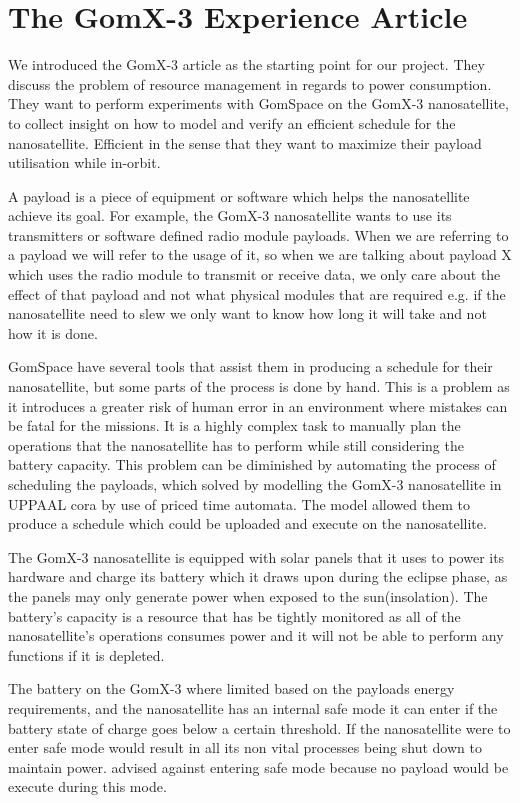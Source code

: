 \section{The GomX-3 Experience Article}
We introduced the GomX-3 article as the starting point for our project. They discuss the problem of resource management in regards to power consumption. They want to perform experiments with GomSpace on the GomX-3 nanosatellite, to collect insight on how to model and verify an efficient schedule for the nanosatellite. Efficient in the sense that they want to maximize their payload utilisation while in-orbit. 

A payload is a piece of equipment or software which helps the nanosatellite achieve its goal. For example, the GomX-3 nanosatellite wants to use its transmitters or software defined radio module payloads. When we are referring to a payload we will refer to the usage of it, so when we are talking about payload X which uses the radio module to transmit or receive data, we only care about the effect of that payload and not what physical modules that are required e.g. if the nanosatellite need to slew we only want to know how long it will take and not how it is done.

GomSpace have several tools that assist them in producing a schedule for their nanosatellite, but some parts of the process is done by hand. This is a problem as it introduces a greater risk of human error in an environment where mistakes can be fatal for the missions. It is a highly complex task to manually plan the operations that the nanosatellite has to perform while still considering the battery capacity. This problem can be diminished by automating the process of scheduling the payloads, which \cite{gomx3} solved by modelling the GomX-3 nanosatellite in UPPAAL \gls{cora} by use of priced time automata. The model allowed them to produce a schedule which could be uploaded and execute on the nanosatellite.

The GomX-3 nanosatellite is equipped with solar panels that it uses to power its hardware and charge its battery which it draws upon during the eclipse phase, as the panels may only generate power when exposed to the sun(insolation). The battery's capacity is a resource that has be tightly monitored as all of the nanosatellite's operations consumes power and it will not be able to perform any functions if it is depleted.\cite{gomx3}

The battery on the GomX-3 where limited based on the payloads energy requirements, and the nanosatellite has an internal safe mode it can enter if the battery state of charge goes below a certain threshold. If the nanosatellite were to enter safe mode would result in all its non vital processes being shut down to maintain power. \cite{gomx3} advised against entering safe mode because no payload would be execute during this mode.

